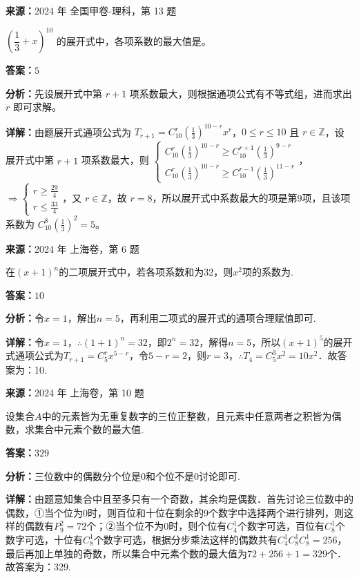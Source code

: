 \begin{question}[points=5]
\textbf{来源：}2024 年 全国甲卷-理科，第 13 题\par
$\left(\dfrac{1}{3}+x\right)^{10}$ 的展开式中，各项系数的最大值是。
\fillin[{$5$}]
\begin{solution}
\textbf{答案：}$5$

\textbf{分析：}先设展开式中第 $r+1$ 项系数最大，则根据通项公式有不等式组，进而求出 $r$ 即可求解。

\textbf{详解：}由题展开式通项公式为 $T_{r+1}=C_{10}^r\left(\frac{1}{3}\right)^{10-r}x^r$，$0\le r\le10$ 且 $r\in\mathbb{Z}$，设展开式中第 $r+1$ 项系数最大，则 $\begin{cases} C_{10}^r\left(\frac{1}{3}\right)^{10-r}\ge C_{10}^{r+1}\left(\frac{1}{3}\right)^{9-r} \\ C_{10}^r\left(\frac{1}{3}\right)^{10-r}\ge C_{10}^{r-1}\left(\frac{1}{3}\right)^{11-r} \end{cases}$，$\Rightarrow\begin{cases} r\ge\frac{29}{4} \\ r\le\frac{33}{4} \end{cases}$，又 $r\in\mathbb{Z}$，故 $r=8$，所以展开式中系数最大的项是第9项，且该项系数为 $C_{10}^8\left(\frac{1}{3}\right)^2=5$。
\end{solution}
\end{question}

\begin{question}[points=4]
\textbf{来源：}2024 年 上海卷，第 6 题\par
在$(x+1)^n$的二项展开式中，若各项系数和为32，则$x^2$项的系数为.
\fillin[{$10$}]
\begin{solution}
\textbf{答案：}$10$

\textbf{分析：}令$x=1$，解出$n=5$，再利用二项式的展开式的通项合理赋值即可.

\textbf{详解：}令$x=1$，$\therefore (1+1)^n=32$，即$2^n=32$，解得$n=5$，所以$(x+1)^5$的展开式通项公式为$T_{r+1}=C_5^r x^{5-r}$，令$5-r=2$，则$r=3$，$\therefore T_4=C_5^3 x^2=10x^2$．故答案为：10.
\end{solution}
\end{question}

\begin{question}[points=5]
\textbf{来源：}2024 年 上海卷，第 10 题\par
设集合$A$中的元素皆为无重复数字的三位正整数，且元素中任意两者之积皆为偶数，求集合中元素个数的最大值.
\fillin[{$329$}]
\begin{solution}
\textbf{答案：}$329$

\textbf{分析：}三位数中的偶数分个位是0和个位不是0讨论即可.

\textbf{详解：}由题意知集合中且至多只有一个奇数，其余均是偶数．首先讨论三位数中的偶数，①当个位为0时，则百位和十位在剩余的9个数字中选择两个进行排列，则这样的偶数有$P_9^2=72$个；②当个位不为0时，则个位有$C_4^1$个数字可选，百位有$C_8^1$个数字可选，十位有$C_8^1$个数字可选，根据分步乘法这样的偶数共有$C_4^1C_8^1C_8^1=256$，最后再加上单独的奇数，所以集合中元素个数的最大值为$72+256+1=329$个．故答案为：329.
\end{solution}
\end{question}

